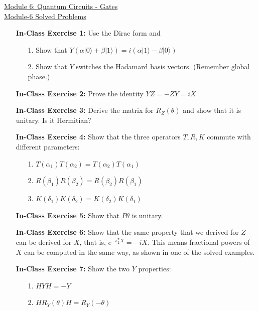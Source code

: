 \documentclass[main.tex]{subfiles}
\begin{document}
\href{https://www2.seas.gwu.edu/~simhaweb/quantum/modules/module6/module6.html}{Module 6: Quantum Circuits - Gates}\\
\href{https://www2.seas.gwu.edu/~simhaweb/quantum/modules/module6/problems6.html}{Module-6 Solved Problems}

\begin{enumerate}

\item[] \textbf{In-Class Exercise 1:} Use the Dirac form and
\begin{enumerate}
    \item [1.] Show that $Y(\alpha|0\rangle+\beta|1\rangle)=i(\alpha|1\rangle-\beta|0\rangle)$
    \item [2.] Show that $Y$ switches the Hadamard basis vectors. (Remember global phase.)
\end{enumerate}

\item[] \textbf{In-Class Exercise 2:} Prove the identity $YZ=-ZY=iX$

\item[] \textbf{In-Class Exercise 3:} Derive the matrix for $R_{Z}(\theta)$ and show that it is unitary. Is it Hermitian?

\item[] \textbf{In-Class Exercise 4:} Show that the three operators $T, R, K$ commute with different parameters:
\begin{enumerate}
    \item [1.] $T\left(\alpha_{1}\right) T\left(\alpha_{2}\right)=T\left(\alpha_{2}\right) T\left(\alpha_{1}\right)$
    \item [2.] $R\left(\beta_{1}\right) R\left(\beta_{2}\right)=R\left(\beta_{2}\right) R\left(\beta_{1}\right)$
    \item [3.] $K\left(\delta_{1}\right) K\left(\delta_{2}\right)=K\left(\delta_{2}\right) K\left(\delta_{1}\right)$ 
\end{enumerate}

\item[] \textbf{In-Class Exercise 5:} Show that $P\theta$ is unitary. 

\item[] \textbf{In-Class Exercise 6:} Show that the same property that we derived for $Z$ can be derived for $X$, that is, $e^{-i \frac{\pi}{2} X}=-i X$. This means fractional powers of $X$ can be computed in the same way, as shown in one of the solved examples.

\item[] \textbf{In-Class Exercise 7:} Show the two $Y$ properties:
\begin{enumerate}
    \item [1.] $H Y H=-Y$
    \item [2.] $H R_{Y}(\theta) H=R_{Y}(-\theta)$
\end{enumerate}


\end{enumerate}
\end{document}
